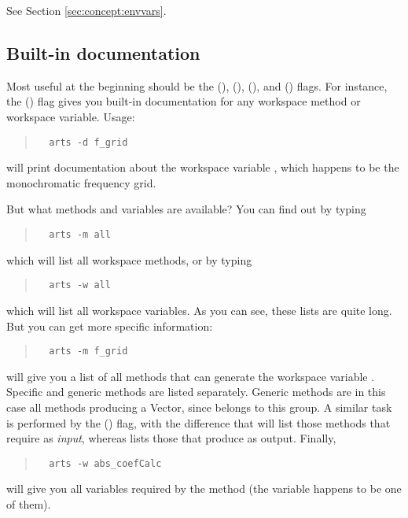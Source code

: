See Section \ref{sec:concept:envvars}.


\subsection*{Built-in documentation}

Most useful at the beginning should be the 
(),  (), 
(), and  () flags.
For instance, the  () flag gives you built-in
documentation for any workspace method or workspace variable. Usage:
\begin{quote}
\begin{verbatim}
  arts -d f_grid
\end{verbatim}
\end{quote}
will print documentation about the workspace variable , which
happens to be the monochromatic frequency grid.

But what methods and variables are available? You can find out by
typing
\begin{quote}
\begin{verbatim}
  arts -m all
\end{verbatim}
\end{quote}
which will list all workspace methods, or by typing 
\begin{quote}
\begin{verbatim}
  arts -w all
\end{verbatim}
\end{quote}
which will list all workspace variables. As you can see, these lists
are quite long. But you can get more specific information:
\begin{quote}
\begin{verbatim}
  arts -m f_grid
\end{verbatim}
\end{quote}
will give you a list of all methods that can generate the workspace
variable . Specific and generic methods are listed
separately. Generic methods are in this case all methods producing a
Vector, since  belongs to this group. A similar task is
performed by the  () flag, with the difference
that  will list those methods that require
 as \emph{input}, whereas  lists
those that produce  as output. Finally,
\begin{quote}
\begin{verbatim}
  arts -w abs_coefCalc
\end{verbatim}
\end{quote}
will give you all variables required by the method 
(the variable  happens to be one of them).



